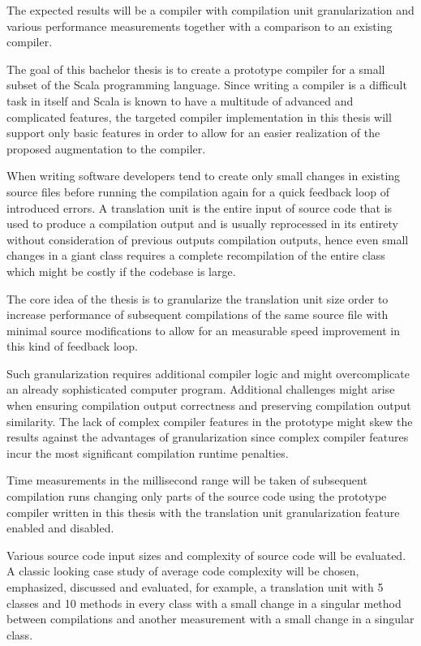\documentclass{VUMIFPSbakalaurinis}
\begin{document}
The expected results will be a compiler with compilation unit granularization and various performance measurements together with a comparison to an existing compiler.

The goal of this bachelor thesis is to create a prototype compiler for a small subset of the Scala programming language.
Since writing a compiler is a difficult task in itself and Scala is known to have a multitude of advanced and complicated features\cite{ScalaSpec}, the targeted compiler implementation in this thesis will support only basic features in order to allow for an easier realization of the proposed augmentation to the compiler.

When writing software developers tend to create only small changes in existing source files before running the compilation again for a quick feedback loop of introduced errors.
A translation unit is the entire input of source code that is used to produce a compilation output and is usually reprocessed in its entirety without consideration of previous outputs compilation outputs, hence even small changes in a giant class requires a complete recompilation of the entire class which might be costly if the codebase is large.

The core idea of the thesis is to granularize the translation unit size order to increase performance of subsequent compilations of the same source file with minimal source modifications to allow for an measurable speed improvement in this kind of feedback loop.

Such granularization requires additional compiler logic and might overcomplicate an already sophisticated computer program.
Additional challenges might arise when ensuring compilation output correctness and preserving compilation output similarity.
The lack of complex compiler features in the prototype might skew the results against the advantages of granularization since complex compiler features incur the most significant compilation runtime penalties.

Time measurements in the millisecond range will be taken of subsequent compilation runs changing only parts of the source code using the prototype compiler written in this thesis with the translation unit granularization feature enabled and disabled.

Various source code input sizes and complexity of source code will be evaluated.
A classic looking case study of average code complexity will be chosen, emphasized, discussed and evaluated, for example, a translation unit with 5 classes and 10 methods in every class with a small change in a singular method between compilations and another measurement with a small change in a singular class.
\end{document}
